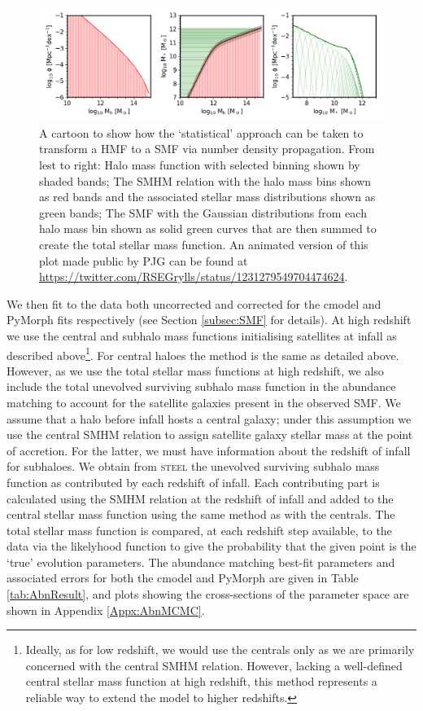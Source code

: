 \begin{figure}[h]
    \centering
    \includegraphics[width = \linewidth]{Figures/Chapter2/gaussian_buildup.png}
    \caption{A cartoon to show how the `statistical' approach can be taken to transform a HMF to a SMF via number density propagation. From lest to right: Halo mass function with selected binning shown by shaded bands; The SMHM relation with the halo mass bins shown as red bands and the associated stellar mass distributions shown as green bands; The SMF with the Gaussian distributions from each halo mass bin shown as solid green curves that are then summed to create the total stellar mass function. An animated version of this plot made public by PJG can be found at \url{https://twitter.com/RSEGrylls/status/1231279549704474624}.}
    \label{fig:Gauss_build}
\end{figure}

We then fit to the \citet{Davidzon2017TheSnapshots} data both uncorrected and corrected for the cmodel and PyMorph fits respectively (see Section \ref{subsec:SMF} for details). At high redshift we use the central and subhalo mass functions initialising satellites at infall as described above\footnote{Ideally, as for low redshift, we would use the centrals only as we are primarily concerned with the central SMHM relation. However, lacking a well-defined central stellar mass function at high redshift, this method represents a reliable way to extend the model to higher redshifts.}. For central haloes the method is the same as detailed above. However, as we use the total stellar mass functions at high redshift, we also include the total unevolved surviving subhalo mass function in the abundance matching to account for the satellite galaxies present in the observed SMF. 
We assume that a halo before infall hosts a central galaxy; under this assumption we use the central SMHM relation to assign satellite galaxy stellar mass at the point of accretion. For the latter, we must have information about the redshift of infall for subhaloes. We obtain from \textsc{steel} the unevolved surviving subhalo mass function as contributed by each redshift of infall. Each contributing part is calculated using the SMHM relation at the redshift of infall and added to the central stellar mass function using the same method as with the centrals. The total stellar mass function is compared, at each redshift step available, to the data via the likelyhood function to give the probability that the given point is the `true' evolution parameters. The abundance matching best-fit parameters and associated errors for both the cmodel and PyMorph are given in Table \ref{tab:AbnResult}, and plots showing the cross-sections of the parameter space are shown in Appendix \ref{Appx:AbnMCMC}.

